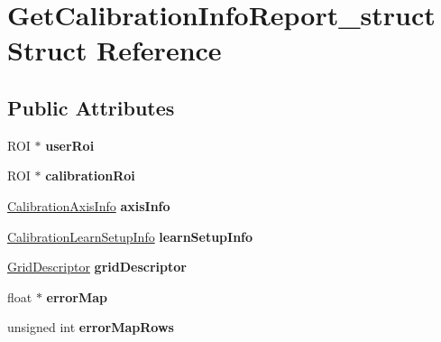 \hypertarget{structGetCalibrationInfoReport__struct}{
\section{GetCalibrationInfoReport\_\-struct Struct Reference}
\label{structGetCalibrationInfoReport__struct}
}
\subsection*{Public Attributes}
\begin{DoxyCompactItemize}
\item 
\hypertarget{structGetCalibrationInfoReport__struct_a1fbc8153fcdd9aed1e48577bdebe08dd}{
ROI $\ast$ {\bfseries userRoi}}
\label{structGetCalibrationInfoReport__struct_a1fbc8153fcdd9aed1e48577bdebe08dd}

\item 
\hypertarget{structGetCalibrationInfoReport__struct_a5c4646a81d9902091a4363ab6124103b}{
ROI $\ast$ {\bfseries calibrationRoi}}
\label{structGetCalibrationInfoReport__struct_a5c4646a81d9902091a4363ab6124103b}

\item 
\hypertarget{structGetCalibrationInfoReport__struct_aa8b0d23e584c37c3fc72386abb659235}{
\hyperlink{structCalibrationAxisInfo__struct}{CalibrationAxisInfo} {\bfseries axisInfo}}
\label{structGetCalibrationInfoReport__struct_aa8b0d23e584c37c3fc72386abb659235}

\item 
\hypertarget{structGetCalibrationInfoReport__struct_a3d3491e48abadd078c2d2dc5c6b24d58}{
\hyperlink{structCalibrationLearnSetupInfo__struct}{CalibrationLearnSetupInfo} {\bfseries learnSetupInfo}}
\label{structGetCalibrationInfoReport__struct_a3d3491e48abadd078c2d2dc5c6b24d58}

\item 
\hypertarget{structGetCalibrationInfoReport__struct_a74f97bf141a6e10866e4e18ae3766eb2}{
\hyperlink{structGridDescriptor__struct}{GridDescriptor} {\bfseries gridDescriptor}}
\label{structGetCalibrationInfoReport__struct_a74f97bf141a6e10866e4e18ae3766eb2}

\item 
\hypertarget{structGetCalibrationInfoReport__struct_a4fe8ffae1652f6f16a1f8615702198ab}{
float $\ast$ {\bfseries errorMap}}
\label{structGetCalibrationInfoReport__struct_a4fe8ffae1652f6f16a1f8615702198ab}

\item 
\hypertarget{structGetCalibrationInfoReport__struct_a38ef50dc93dc5d9071b8537d6d882100}{
unsigned int {\bfseries errorMapRows}}
\label{structGetCalibrationInfoReport__struct_a38ef50dc93dc5d9071b8537d6d882100}


\end{DoxyCompactItemize}
